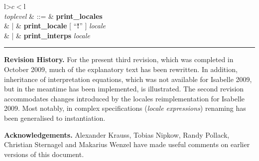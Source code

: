 \begin{isabellebody}
\begin{isamarkuptext}
\begin{table}
\begin{center}
\begin{tabular}{l>$c<$l}
   \\

  \textit{toplevel} & ::=
  & \textbf{print\_locales} \\
  & | & \textbf{print\_locale} [ ``\textbf{!}'' ] \textit{locale} \\
  & | & \textbf{print\_interps} \textit{locale}
\end{tabular}
\end{center}
\hrule
\caption{Syntax of Locale Commands.}
\label{tab:commands}
\end{table}%
\end{isamarkuptext}%
\isamarkuptrue%
%
\begin{isamarkuptext}%
\textbf{Revision History.}  For the present third revision,
  which was completed in October 2009, much of the explanatory text
  has been rewritten.  In addition, inheritance of interpretation
  equations, which was not available for Isabelle 2009, but in the
  meantime has been implemented, is illustrated.  The second revision
  accommodates changes introduced by the locales reimplementation for
  Isabelle 2009.  Most notably, in complex specifications
  (\emph{locale expressions}) renaming has been generalised to
  instantiation.%
\end{isamarkuptext}%
\isamarkuptrue%
%
\begin{isamarkuptext}%
\textbf{Acknowledgements.}  Alexander Krauss, Tobias Nipkow,
  Randy Pollack, Christian Sternagel and Makarius Wenzel have made
  useful comments on earlier versions of this document.%
\end{isamarkuptext}%
\isamarkuptrue%
%
\isadelimtheory
%
\endisadelimtheory
%
\isatagtheory
{}\isamarkupfalse%
%
\endisatagtheory
{\isafoldtheory}%
%
\isadelimtheory
%
\endisadelimtheory
\isanewline
\end{isabellebody}%
